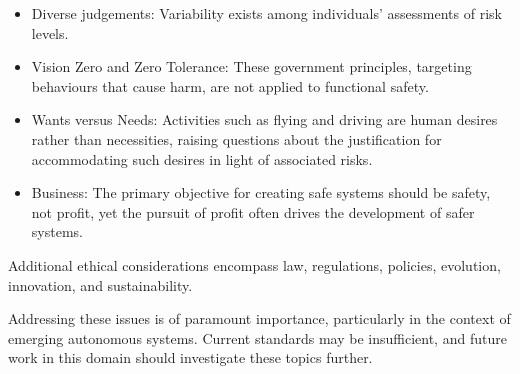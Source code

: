 \documentclass[./dissertation.tex]{subfiles}
\begin{document}
\begin{itemize}
\item Diverse judgements: Variability exists among individuals' assessments of risk levels.
\item Vision Zero and Zero Tolerance: These government principles, targeting behaviours that cause harm, are not applied to functional safety.
\item Wants versus Needs: Activities such as flying and driving are human desires rather than necessities, raising questions about the justification for accommodating such desires in light of associated risks.
\item Business: The primary objective for creating safe systems should be safety, not profit, yet the pursuit of profit often drives the development of safer systems.

\end{itemize}
Additional ethical considerations encompass law, regulations, policies, evolution, innovation, and sustainability.

Addressing these issues is of paramount importance, particularly in the context of emerging autonomous systems. Current standards may be insufficient, and future work in this domain should investigate these topics further.
\end{document}
